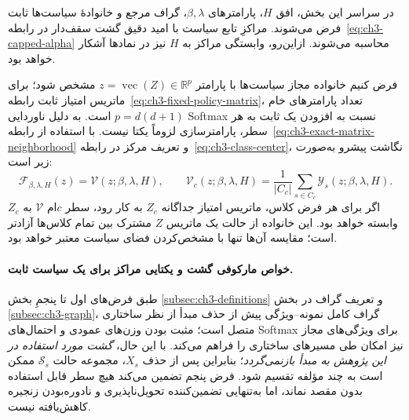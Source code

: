 در سراسر این بخش، افق $H$، پارامترهای $\beta,\lambda$، گراف مرجع و خانوادهٔ سیاست‌ها ثابت فرض می‌شوند. مراکزِ تابع سیاست با امید دقیق گشت سقف‌دار در رابطه~\eqref{eq:ch3-capped-alpha} محاسبه می‌شوند. ازاین‌رو، وابستگی مراکز به $H$ نیز در نمادها آشکار خواهد بود.

فرض کنیم خانواده مجاز سیاست‌ها با پارامتر $z=\operatorname{vec}(Z)\in\mathbb R^p$ مشخص شود؛ برای ماتریس امتیاز ثابت رابطه~\eqref{eq:ch3-fixed-policy-matrix}، تعداد پارامترهای خام $p=d(d+1)$ است. به دلیل ناوردایی Softmax نسبت به افزودن یک ثابت به هر سطر، پارامترسازی لزوماً یکتا نیست. با استفاده از رابطه~\eqref{eq:ch3-exact-matrix-neighborhood} و تعریف مرکز در رابطه~\eqref{eq:ch3-class-center}، نگاشت پیشرو به‌صورت زیر است:
\begin{equation}\label{eq:ch3-center-forward-map}
\mathcal F_{\beta,\lambda,H}(z)=\mathcal V(z;\beta,\lambda,H),
\qquad
\mathcal V_c(z;\beta,\lambda,H)=
\frac{1}{|C_c|}\sum_{s\in C_c}\mathscr Y_s(z;\beta,\lambda,H).
\end{equation}
اگر برای هر فرض کلاس، ماتریس امتیاز جداگانه $Z_c$ به کار رود، سطر $c$ام $\mathcal V$ به $Z_c$ وابسته خواهد بود. این خانواده از حالت یک ماتریس $Z$ مشترک بین تمام کلاس‌ها آزادتر است؛ مقایسه آن‌ها تنها با مشخص‌کردن فضای سیاست معتبر خواهد بود.


\paragraph{خواص مارکوفی گشت و یکتایی مراکز برای یک سیاست ثابت.}
طبق فرض‌های اول تا پنجمِ بخش
\ref{subsec:ch3-definitions}
و تعریف گراف در بخش
\ref{subsec:ch3-graph}،
گراف کامل نمونه--ویژگی پیش از
حذف مبدأ از نظر ساختاری متصل است؛
مثبت بودن وزن‌های عمودی و
احتمال‌های Softmax برای ویژگی‌های
مجاز نیز امکان طی مسیرهای ساختاری
را فراهم می‌کند. با این حال،
\emph{گشت مورد استفاده در این پژوهش
به مبدأ بازنمی‌گردد}؛ بنابراین
پس از حذف $X_s$، مجموعه حالت
$\mathcal S_s$ ممکن است به
چند مؤلفه تقسیم شود.
فرض پنجم تضمین می‌کند هیچ سطر
قابل استفاده بدون مقصد نماند،
اما به‌تنهایی تضمین‌کننده
تحویل‌ناپذیری و نادوره‌بودن
زنجیره کاهش‌یافته نیست.

